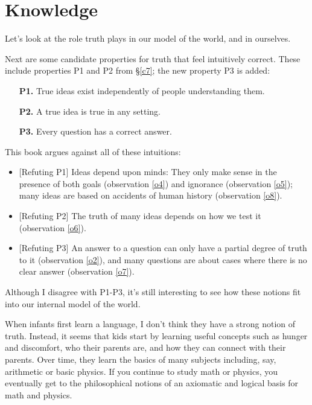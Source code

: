 \documentclass[9pt, twoside]{book}
\theoremstyle{argtstyle}
\begin{document}
\section{Knowledge}


Let's look at the role truth plays in our model of the world, and in
ourselves.

Next are some candidate properties for truth that feel intuitively correct.
These include properties P1 and P2 from \S\ref{c7}; the new property
P3 is added:
\begin{itemize}
    \item[{\bf P1.}] True ideas exist independently of people understanding
        them.
    \item[{\bf P2.}] A true idea is true in any setting.
    \item[{\bf P3.}] Every question has a correct answer.
\end{itemize}
This book argues against all of these intuitions:
\begin{itemize}
\item{} [Refuting P1] Ideas depend upon minds: They only make sense in the presence of
both goals (observation \ref{o4}) and ignorance (observation \ref{o5}); many
ideas are based on accidents of human history (observation \ref{o8}).
\item{} [Refuting P2] The
truth of many ideas depends on how we test it (observation \ref{o6}).
\item{} [Refuting P3] An answer to a question can only have a partial degree of truth to
it
(observation \ref{o2}), and many questions are about cases where
there is no clear answer (observation \ref{o7}).
\end{itemize}

Although I disagree with P1-P3, it's still interesting to see how these notions
fit into our internal model of the world.

When infants first learn a language,
I don't think they have a strong
notion of truth.
Instead, it seems that kids start by learning
useful concepts such as
hunger and discomfort, who their parents are, and how they can connect with
their parents.
Over time, they learn the basics of many subjects including, say,
arithmetic or basic physics.
If you continue to study math or physics, you eventually get to the
philosophical notions of an axiomatic and logical basis for math and physics.
\end{document}
